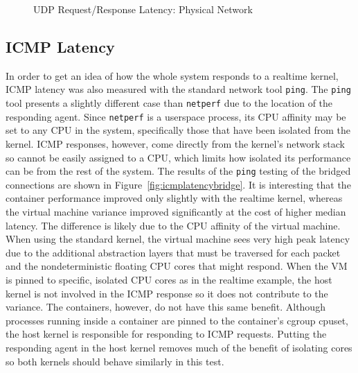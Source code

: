 \begin{figure}
    \centering
    \def\svgwidth{\columnwidth}
    
    \caption{UDP Request/Response Latency: Physical Network}
    \label{fig:udp_rr_phys}
\end{figure}


\subsection{ICMP Latency} %
\label{sub:icmplatency}

In order to get an idea of how the whole system responds to a realtime kernel, ICMP latency was also measured with the standard network tool \texttt{ping}.  
The \texttt{ping} tool presents a slightly different case than \texttt{netperf} due to the location of the responding agent.  
Since \texttt{netperf} is a userspace process, its CPU affinity may be set to any CPU in the system, specifically those that have been isolated from the kernel.
ICMP responses, however, come directly from the kernel's network stack so cannot be easily assigned to a CPU, which limits how isolated its performance can be from the rest of the system.
The results of the \texttt{ping} testing of the bridged connections are shown in Figure~\ref{fig:icmplatencybridge}.
It is interesting that the container performance improved only slightly with the realtime kernel, whereas the virtual machine variance improved significantly at the cost of higher median latency.  
The difference is likely due to the CPU affinity of the virtual machine.  
When using the standard kernel, the virtual machine sees very high peak latency due to the additional abstraction layers that must be traversed for each packet and the nondeterministic floating CPU cores that might respond.
When the VM is pinned to specific, isolated CPU cores as in the realtime example, the host kernel is not involved in the ICMP response so it does not contribute to the variance.
The containers, however, do not have this same benefit.
Although processes running inside a container are pinned to the container's cgroup cpuset, the host kernel is responsible for responding to ICMP requests.
Putting the responding agent in the host kernel removes much of the benefit of isolating cores so both kernels should behave similarly in this test.

